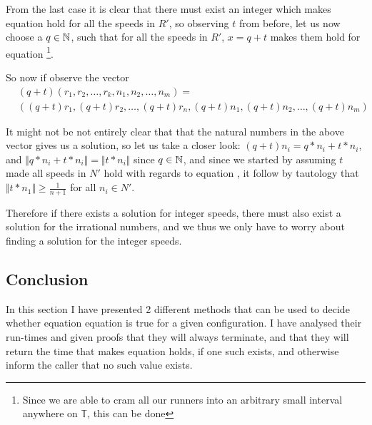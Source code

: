 \begin{description}
From the last case it is clear that there must exist an integer which makes equation  hold for all the speeds in $R\prime$, so observing $t$ from before, let us now choose a $q \in \mathbb{N}$, such that for all the speeds in $R\prime$, $x = q + t$ makes them hold for equation \footnote{Since we are able to cram all our runners into an arbitrary small interval anywhere on $\mathbb{T}$, this can be done}.

So now if observe the vector 
\begin{equation}
\begin{split}
&(q + t)(r_1, r_2, \ldots, r_k, n_1, n_2, \ldots, n_m) =\\ 
&((q + t)r_1, (q + t)r_2, \ldots, (q + t)r_n, (q + t)n_1, (q + t)n_2, \ldots, (q + t)n_m) 
\end{split}
\end{equation}

It might not be not entirely clear that that the natural numbers in the above vector gives us a solution, so let us take a closer look: 
$(q + t)n_i = q * n_i + t * n_i$, and $\Vert q * n_i + t * n_i \Vert = \Vert t * n_i \Vert$ since $q \in \mathbb{N}$, and since we started by assuming $t$ made all speeds in $N\prime$ hold with regards to equation , it follow by tautology that $\Vert t * n_1 \Vert \geq \frac{1}{n+1}$ for all $n_i \in N\prime$.

Therefore if there exists a solution for integer speeds, there must also exist a solution for the irrational numbers, and we thus we only have to worry about finding a solution for the integer speeds.
\end{description}

\subsection{Conclusion}
In this section I have presented 2 different methods that can be used to decide whether equation equation  is true for a given configuration. I have analysed their run-times and given proofs that they will always terminate, and that they will return the time that makes equation  holds, if one such exists, and otherwise inform the caller that no such value exists.
